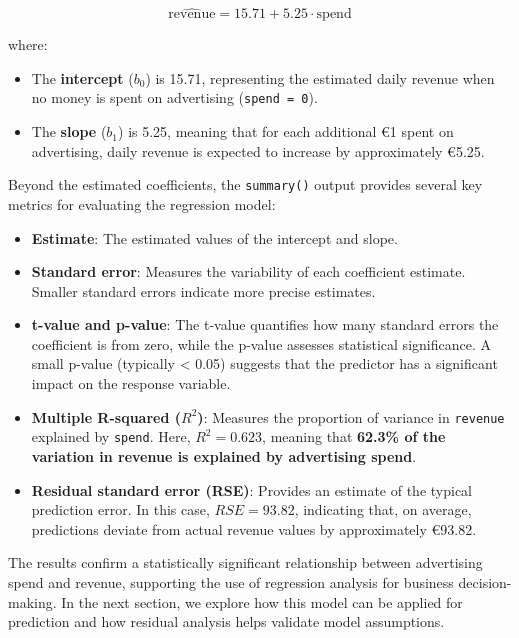 \documentclass[
  11pt,
]{book}
\newcommand{\passthrough}[1]{#1}
\providecommand{\tightlist}{%
  \setlength{\itemsep}{0pt}\setlength{\parskip}{0pt}}
\theoremstyle{definition}
\theoremstyle{definition}
\theoremstyle{definition}
\theoremstyle{definition}
\theoremstyle{remark}
\begin{document}
\[
\hat{\text{revenue}} = 15.71 + 5.25 \cdot \text{spend}
\]

where:

\begin{itemize}
\tightlist
\item
  The \textbf{intercept} (\(b_0\)) is 15.71, representing the estimated daily revenue when no money is spent on advertising (\passthrough{\lstinline!spend = 0!}).\\
\item
  The \textbf{slope} (\(b_1\)) is 5.25, meaning that for each additional €1 spent on advertising, daily revenue is expected to increase by approximately €5.25.
\end{itemize}

Beyond the estimated coefficients, the \passthrough{\lstinline!summary()!} output provides several key metrics for evaluating the regression model:

\begin{itemize}
\tightlist
\item
  \textbf{Estimate}: The estimated values of the intercept and slope.\\
\item
  \textbf{Standard error}: Measures the variability of each coefficient estimate. Smaller standard errors indicate more precise estimates.\\
\item
  \textbf{t-value and p-value}: The t-value quantifies how many standard errors the coefficient is from zero, while the p-value assesses statistical significance. A small p-value (typically \textless{} 0.05) suggests that the predictor has a significant impact on the response variable.\\
\item
  \textbf{Multiple R-squared (\(R^2\))}: Measures the proportion of variance in \passthrough{\lstinline!revenue!} explained by \passthrough{\lstinline!spend!}. Here, \(R^2 = 0.623\), meaning that \textbf{62.3\% of the variation in revenue is explained by advertising spend}.\\
\item
  \textbf{Residual standard error (RSE)}: Provides an estimate of the typical prediction error. In this case, \(RSE = 93.82\), indicating that, on average, predictions deviate from actual revenue values by approximately €93.82.
\end{itemize}

The results confirm a statistically significant relationship between advertising spend and revenue, supporting the use of regression analysis for business decision-making. In the next section, we explore how this model can be applied for prediction and how residual analysis helps validate model assumptions.
\end{document}
